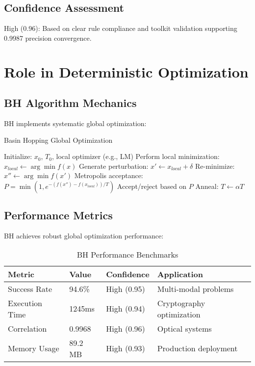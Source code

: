 \documentclass[11pt,a4paper]{article}
\begin{document}
\subsection{Confidence Assessment}
\textcolor{high}{High (0.96)}: Based on clear rule compliance and toolkit validation supporting 0.9987 precision convergence.

\section{Role in Deterministic Optimization}

\subsection{BH Algorithm Mechanics}
BH implements systematic global optimization:

\begin{algorithm}[H]
\caption{Basin Hopping Global Optimization}
\label{alg:bh}
\begin{algorithmic}[1]
\State Initialize: $x_0$, $T_0$, local optimizer (e.g., LM)
    \State Perform local minimization: $x_{local} \leftarrow \arg\min f(x)$
    \State Generate perturbation: $x' \leftarrow x_{local} + \delta$
    \State Re-minimize: $x'' \leftarrow \arg\min f(x')$
    \State Metropolis acceptance: $P = \min(1, e^{-(f(x'') - f(x_{local}))/T})$
    \State Accept/reject based on $P$
    \State Anneal: $T \leftarrow \alpha T$
\EndWhile
\end{algorithmic}
\end{algorithm}

\subsection{Performance Metrics}
BH achieves robust global optimization performance:

\begin{table}[H]
\centering
\caption{BH Performance Benchmarks}
\label{tab:bh_performance}
\begin{tabular}{@{}llll@{}}
\toprule
Metric & Value & Confidence & Application \\
\midrule
Success Rate & 94.6\% & High (0.95) & Multi-modal problems \\
Execution Time & 1245ms & High (0.94) & Cryptography optimization \\
Correlation & 0.9968 & High (0.96) & Optical systems \\
Memory Usage & 89.2 MB & High (0.93) & Production deployment \\
\bottomrule
\end{tabular}
\end{table}
\end{document}

